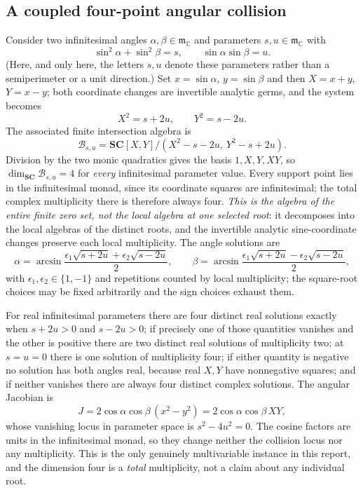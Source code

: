 \documentclass[11pt,letterpaper]{article}
\numberwithin{equation}{section}
\theoremstyle{definition}
\theoremstyle{remark}
\newcommand{\SC}{\mathbf{SC}}
\newcommand{\C}{\mathbb C}
\newcommand{\mm}{\mathfrak m}
\begin{document}
\subsection{A coupled four-point angular collision}\label{trigonometry:sec:coupled}
Consider two infinitesimal angles $\alpha,\beta\in\mm_{\C}$ and parameters $s,u\in\mm_{\C}$ with
\begin{equation}\label{trigonometry:eq:coupled}
 \sin^2\alpha+\sin^2\beta=s,\qquad \sin\alpha\sin\beta=u .
\end{equation}
(Here, and only here, the letters $s,u$ denote these parameters rather than a semiperimeter or a
unit direction.) Set $x=\sin\alpha$, $y=\sin\beta$ and then $X=x+y$, $Y=x-y$; both coordinate
changes are invertible analytic germs, and the system becomes
\begin{equation}\label{trigonometry:eq:coupleddiagonal}
 X^2=s+2u,\qquad Y^2=s-2u .
\end{equation}
The associated finite intersection algebra is
\[
 \mathcal B_{s,u}=\SC[X,Y]/(X^2-s-2u,\ Y^2-s+2u).
\]
Division by the two monic quadratics gives the basis $1,X,Y,XY$, so
$\dim_{\SC}\mathcal B_{s,u}=4$ for \emph{every} infinitesimal parameter value. Every support point
lies in the infinitesimal monad, since its coordinate squares are infinitesimal; the total complex
multiplicity there is therefore always four. \emph{This is the algebra of the entire finite zero
set, not the local algebra at one selected root}: it decomposes into the local algebras of the
distinct roots, and the invertible analytic sine-coordinate changes preserve each local
multiplicity. The angle solutions are
\begin{equation}\label{trigonometry:eq:coupledroots}
 \alpha=\arcsin\frac{\epsilon_1\sqrt{s+2u}+\epsilon_2\sqrt{s-2u}}2,
 \qquad
 \beta=\arcsin\frac{\epsilon_1\sqrt{s+2u}-\epsilon_2\sqrt{s-2u}}2,
\end{equation}
with $\epsilon_1,\epsilon_2\in\{1,-1\}$ and repetitions counted by local multiplicity; the
square-root choices may be fixed arbitrarily and the sign choices exhaust them.

For real infinitesimal parameters there are four distinct real solutions exactly when $s+2u>0$ and
$s-2u>0$; if precisely one of those quantities vanishes and the other is positive there are two
distinct real solutions of multiplicity two; at $s=u=0$ there is one solution of multiplicity four;
if either quantity is negative no solution has both angles real, because real $X,Y$ have
nonnegative squares; and if neither vanishes there are always four distinct complex solutions. The
angular Jacobian is
\[
 J=2\cos\alpha\cos\beta\,(x^2-y^2)=2\cos\alpha\cos\beta\,XY,
\]
whose vanishing locus in parameter space is $s^2-4u^2=0$. The cosine factors are units in the
infinitesimal monad, so they change neither the collision locus nor any multiplicity. This is the
only genuinely multivariable instance in this report, and the dimension four is a \emph{total}
multiplicity, not a claim about any individual root.
\end{document}
